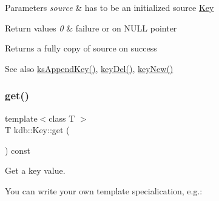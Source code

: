 \begin{DoxyParams}{Parameters}
{\em source} & has to be an initialized source \mbox{\hyperlink{classkdb_1_1Key}{Key}} \\
\hline
\end{DoxyParams}

\begin{DoxyRetVals}{Return values}
{\em 0} & failure or on N\+U\+LL pointer \\
\hline
\end{DoxyRetVals}
\begin{DoxyReturn}{Returns}
a fully copy of source on success 
\end{DoxyReturn}
\begin{DoxySeeAlso}{See also}
\mbox{\hyperlink{group__keyset_gaa5a1d467a4d71041edce68ea7748ce45}{ks\+Append\+Key()}}, \mbox{\hyperlink{group__key_ga3df95bbc2494e3e6703ece5639be5bb1}{key\+Del()}}, \mbox{\hyperlink{group__key_gad23c65b44bf48d773759e1f9a4d43b89}{key\+New()}} 
\end{DoxySeeAlso}
\mbox{\label{classkdb_1_1Key_ac558a1f1b2cb50d77fbabcbb24950c05}} 
\subsubsection{\texorpdfstring{get()}{get()}}
{\footnotesize\ttfamily template$<$class T $>$ \\
T kdb\+::\+Key\+::get (\begin{DoxyParamCaption}{ }\end{DoxyParamCaption}) const\hspace{0.3cm}{\ttfamily [inline]}}



Get a key value. 

You can write your own template specialication, e.\+g.\+: 
\begin{DoxyCode}{0}
\DoxyCodeLine{\textcolor{keyword}{template} <>}
\DoxyCodeLine{\textcolor{keyword}{}\{}
\DoxyCodeLine{        \{}
\DoxyCodeLine{        \}}
\DoxyCodeLine{}
\DoxyCodeLine{\}}
\end{DoxyCode}


